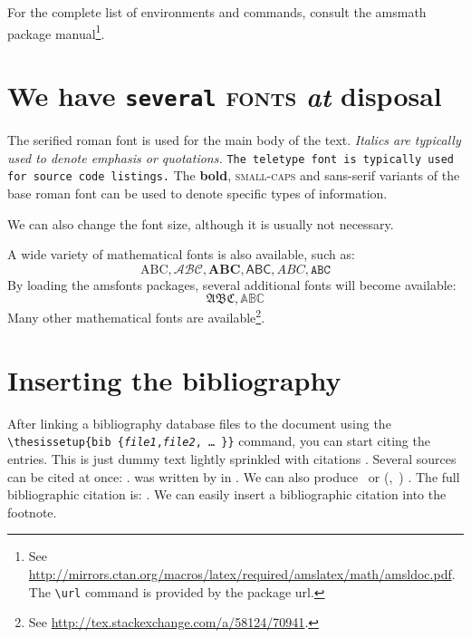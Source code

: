 \documentclass[
  digital, %
  table,   %
  lof,     %
  lot,     %
]{fithesis3}
\begin{document}
For the complete list of environments and commands, consult the
\textsf{amsmath} package manual\footnote{
  See \url{http://mirrors.ctan.org/macros/latex/required/amslatex/math/amsldoc.pdf}.
  The \texttt{\textbackslash url} command is provided by the
  package \textsf{url}.
}.

\chapter{\textnormal{We \textsf{have} \texttt{several} \textsc{fonts}
  \textit{at} \textbf{disposal}}}
The serified roman font is used for the main body of the text.
\textit{Italics are typically used to denote emphasis or
quotations.} \texttt{The teletype font is typically used for source
code listings.} The \textbf{bold}, \textsc{small-caps} and
\textsf{sans-serif} variants of the base roman font can be used to
denote specific types of information.

\tiny We \scriptsize can \footnotesize also \small change \normalsize
the \large font \Large size, \LARGE although \huge it \Huge
is \huge usually \LARGE not \Large necessary.\normalsize

A wide variety of mathematical fonts is also available, such as: \[
  \mathrm{ABC}, \mathcal{ABC}, \mathbf{ABC}, \mathsf{ABC},
  \mathit{ABC}, \mathtt{ABC}
\] By loading the \textsf{amsfonts} packages, several additional
fonts will become available: \[
  \mathfrak{ABC}, \mathbb{ABC}
\] Many other mathematical fonts are available\footnote{
  See \url{http://tex.stackexchange.com/a/58124/70941}.
}.


\chapter{Inserting the bibliography}
After linking a bibliography data\-base files to the document using
the \verb"\"\texttt{thesis\discretionary{-}{}{}setup\{bib\discretionary{=}{=}{=}%
\{\textit{file1},\textit{file2},\,\ldots\,\}\}} command, you can
start citing the entries. This is just dummy text
\parencite{borgman03} lightly sprinkled with citations
\parencite[p.~123]{greenberg98}. Several sources can be cited at
once: \cite{borgman03,greenberg98,thanh01}.
 was written by \citeauthor{greenberg98} in
\citeyear{greenberg98}. We can also produce \textcite{greenberg98}%
\ or %
\def\citeauthoryear#1{(\textcite{#1},~\citeyear{#1})}%
\citeauthoryear{greenberg98}%
. The full bibliographic citation is:
\emph{}. We can easily insert a bibliographic
citation into the footnote.
\end{document}
